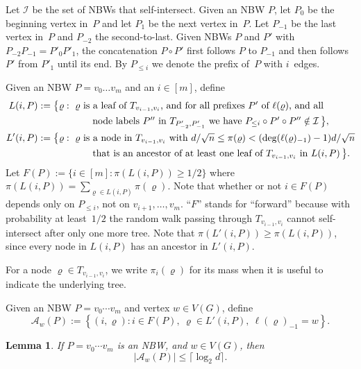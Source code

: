 \documentclass[11pt,a4paper]{article}
\theoremstyle{plain}
\newtheorem{lemma}[theorem]{Lemma}
\def\calI{\mathcal{I}}
\def\nn{\sqrt{n}}
\def\deg{\mathrm{deg}}
\let\rho=\varrho
\begin{document}
 
Let $\calI$ be the set of NBWs that self-intersect. 
Given an NBW $P$, let $P_0$ be the 
beginning vertex in~$P$ and let $P_1$ be the next vertex in~$P$. Let $P_{-1}$ be the last vertex in~$P$ and $P_{-2}$ the second-to-last.
Given NBWs $P$ and $P'$ with $P_{-2} P_{-1} = P'_{0} P'_1$, the concatenation $P \circ P'$ first follows $P$ to $P_{-1}$ and then follows $P'$ from $P'_1$ until its end.
By $P_{\leq i}$ we denote the prefix of~$P$ with $i$~edges.


Given an NBW $P=v_0\ldots v_m$  and an $i \in [m]$,
define
\begin{align*} L(i,P) &:= 
\big\{ \rho : \mbox{ 
$\rho$ is
a leaf of $T_{v_{i-1},v_i}$, and 
for all prefixes $P'$ of $\ell(\rho)$, and all }\\
& \hspace{2truecm}\mbox{node labels $P''$ in $T_{P'_{-2},P'_{-1}}$ we have
$P_{\leq i} \circ P' \circ P''\notin \calI$}\,\big\},\\
L'(i,P) &:= 
\big\{ \rho : \mbox{ 
$\rho$ is
a node in $T_{v_{i-1},v_i}$ with $d/ \nn \leq \pi(\rho) < (\deg(\ell(\rho)_{-1})-1) d /\nn$}\\
& \hspace{2truecm}
\mbox{that is an ancestor of at least one leaf 
of $T_{v_{i-1},v_i}$  
in $L(i,P)$}\,\big\}.
\end{align*}
Let $F(P)  := \{i\in  [m]: \pi(L(i,P)) \geq 1/2\}$ where $\pi(L(i,P))=\sum_{\rho\in L(i,P)}\pi(\rho)$.
Note that whether or not $i\in F(P)$ depends only on $P_{\leq i}$, not on $v_{i+1},\ldots,v_m$.
``$F$'' stands for ``forward'' because with probability at least~$1/2$ the random walk passing through $T_{v_{i-1},v_i}$ cannot self-intersect after only one more tree.
Note that $\pi(L'(i,P)) \geq \pi(L(i,P))$, since every  
node  
in $L(i,P)$ has an ancestor in $L'(i,P)$.

        

For a node $\rho\in T_{v_{i-1},v_i}$, we write
$\pi_i(\rho)$ for its mass when it is useful to indicate the
underlying tree.

Given an NBW $P=v_0\cdots v_m$ and vertex $w\in V(G)$, define
\[
\mathcal A_w(P)
:=
\left\{
(i,\rho):
i\in F(P),\
\rho\in L'(i,P),\
\ell(\rho)_{-1}=w
\right\}.
\]

\begin{lemma}\label{lem:endpoint-mult}
If $P=v_0\cdots v_m$ is an NBW, and $w\in V(G)$, then
\[
|\mathcal A_w(P)|
\le
\lceil\log_2 d\rceil.
\]
\end{lemma}
\end{document}
